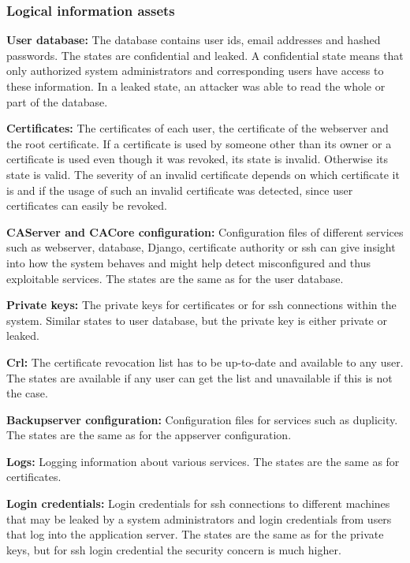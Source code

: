 \documentclass[english]{article}
\begin{document}
\subsubsection{Logical information assets}
	\begin{description}
		\item{\textbf{User database:}} The database contains user ids, email addresses and hashed passwords. The states are confidential and leaked. A confidential state means that only authorized system administrators and corresponding users have access to these information. In a leaked state, an attacker was able to read the whole or part of the database.
		\item{\textbf{Certificates:}} The certificates of each user, the certificate of the webserver and the root certificate. If a certificate is used by someone other than its owner or a certificate is used even though it was revoked, its state is invalid. Otherwise its state is valid. The severity of an invalid certificate depends on which certificate it is and if the usage of such an invalid certificate was detected, since user certificates can easily be revoked.
		\item{\textbf{CAServer and CACore configuration:}} Configuration files of different services such as webserver, database, Django, certificate authority or ssh can give insight into how the system behaves and might help detect misconfigured and thus exploitable services. The states are the same as for the user database.
		\item{\textbf{Private keys:}} The private keys for certificates or for ssh connections within the system. Similar states to user database, but the private key is either private or leaked.
		\item{\textbf{Crl:}} The certificate revocation list has to be up-to-date and available to any user. The states are available if any user can get the list and unavailable if this is not the case.
		\item{\textbf{Backupserver configuration:}} Configuration files for services such as duplicity. The states are the same as for the appserver configuration.
		\item{\textbf{Logs:}} Logging information about various services. The states are the same as for certificates.
		\item{\textbf{Login credentials:}} Login credentials for ssh connections to different machines that may be leaked by a system administrators and login credentials from users that log into the application server. The states are the same as for the private keys, but for ssh login credential the security concern is much higher.

\end{description}
\end{document}
